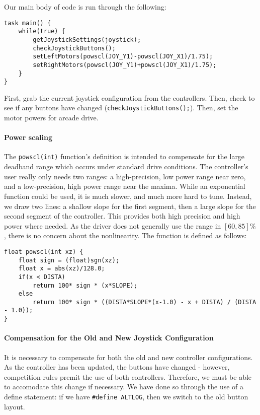Our main body of code is run through the following:

\begin{lstlisting}[tabsize=4]
task main() {
	while(true) {
		getJoystickSettings(joystick);
		checkJoystickButtons();
		setLeftMotors(powscl(JOY_Y1)-powscl(JOY_X1)/1.75);
		setRightMotors(powscl(JOY_Y1)+powscl(JOY_X1)/1.75);
	}
}
\end{lstlisting}

First, grab the current joystick configuration from the controllers. Then, check to see if any buttons have changed (\lstinline{checkJoystickButtons();}{}). Then, set the motor powers for arcade drive. 

\paragraph{Power scaling} The \lstinline{powscl(int)}{} function's definition is intended to compensate for the large deadband range which occurs under standard drive conditions. The controller's user really only needs two ranges: a high-precision, low power range near zero, and a low-precision, high power range near the maxima. While an exponential function could be used, it is much slower, and much more hard to tune. Instead, we draw two lines: a shallow slope for the first segment, then a large slope for the second segment of the controller. This provides both high precision and high power where needed. As the driver does not generally use the range in $[60,85]\%$, there is no concern about the nonlinearity. The function is defined as follows:

\begin{lstlisting}[tabsize=4]
float powscl(int xz) {
	float sign = (float)sgn(xz);
	float x = abs(xz)/128.0;
	if(x < DISTA)
		return 100* sign * (x*SLOPE);
	else
		return 100* sign * ((DISTA*SLOPE*(x-1.0) - x + DISTA) / (DISTA - 1.0));
}
\end{lstlisting}

\paragraph{Compensation for the Old and New Joystick Configuration} It is necessary to compensate for both the old and new controller configurations. As the controller has been updated, the buttons have changed - however, competition rules premit the use of both controllers. Therefore, we must be able to accomodate this change if necessary. We have done so through the use of a define statement: if we have \lstinline{#define ALTLOG}{}, then we switch to the old button layout.

